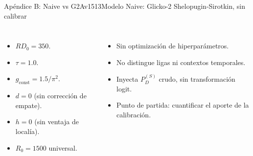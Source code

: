 \documentclass[aspectratio=169,11pt]{beamer}
\begin{document}
\begin{frame}{Ap\'endice B: Naive vs G2Av1513}{Modelo Naive: Glicko-2 Shelopugin-Sirotkin, sin calibrar}
	\vspace*{-0.6cm}
	\begin{columns}[T,onlytextwidth]
		\par\vskip 2mm
		\footnotesize
		\begin{itemize}
			\item $RD_0 = 350$.
			\item $\tau = 1{.}0$.
			\item $g_{\text{const}} = 1{.}5/\pi^2$.
			\item $d = 0$ (sin correcci\'on de empate).
			\item $h = 0$ (sin ventaja de local\'ia).
			\item $R_0 = 1500$ universal.
		\end{itemize}
		\par\vskip 2mm
		\footnotesize
		\begin{itemize}
			\item Sin optimizaci\'on de hiperpar\'ametros.
			\item No distingue ligas ni contextos temporales.
			\item Inyecta $P_D^{(S)}$ crudo, sin transformaci\'on logit.
			\item Punto de partida: cuantificar el aporte de la calibraci\'on.
		\end{itemize}
	\end{columns}
	\vskip 2mm
\end{frame}
\end{document}
